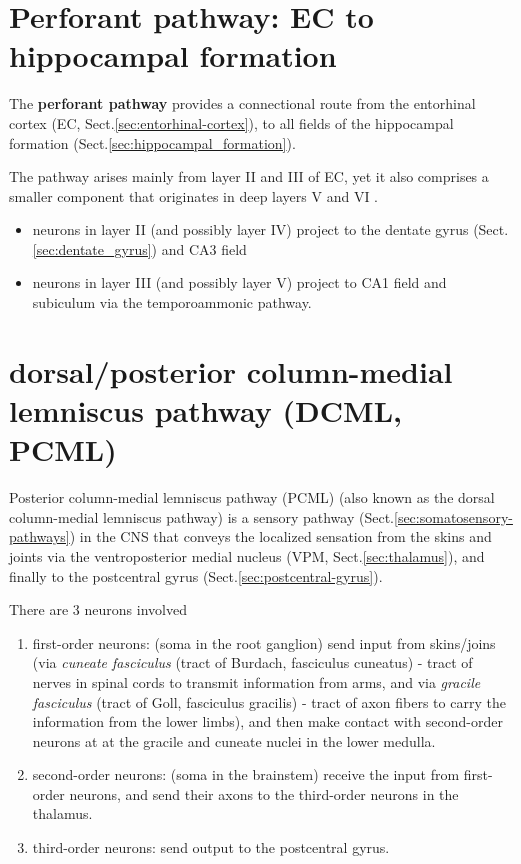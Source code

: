 \section{Perforant pathway: EC to hippocampal formation}
\label{sec:perforant-pathway}

The {\bf perforant pathway} provides a connectional route from the entorhinal
cortex (EC, Sect.\ref{sec:entorhinal-cortex}), to all fields of the 
hippocampal formation (Sect.\ref{sec:hippocampal_formation}).

The pathway arises mainly from layer II and III of EC, yet it also
comprises a smaller component that originates in deep layers V and VI
\citep{witter2007}.

\begin{itemize}
  \item neurons in layer II (and possibly layer IV) project to the dentate gyrus
  (Sect.\ref{sec:dentate_gyrus}) and CA3 field
  
  \item neurons in layer III (and possibly layer V) project to CA1 field and
  subiculum via the temporoammonic pathway.
\end{itemize}


\section{dorsal/posterior column-medial lemniscus pathway (DCML, PCML)}
\label{sec:PCML}
\label{sec:DCML}

Posterior column-medial lemniscus pathway (PCML) (also known as the dorsal
column-medial lemniscus pathway) is a sensory pathway
(Sect.\ref{sec:somatosensory-pathways}) in the CNS that conveys the localized
sensation from the skins and joints via the ventroposterior medial nucleus
(VPM, Sect.\ref{sec:thalamus}), and finally to the postcentral gyrus
(Sect.\ref{sec:postcentral-gyrus}).

There are 3 neurons involved
\begin{enumerate}
  \item first-order neurons: (soma in the root ganglion) send input from
  skins/joins (via {\it cuneate fasciculus} (tract of Burdach, fasciculus cuneatus) - tract of
  nerves in spinal cords to transmit information from arms, and via
  {\it gracile fasciculus} (tract of Goll, fasciculus gracilis) - tract of
  axon fibers to carry the information from the lower limbs), 
  and then make
  contact with second-order neurons at at the gracile and cuneate nuclei in the lower medulla.
    
  \item second-order neurons: (soma in the brainstem) receive the input from
  first-order neurons, and send their axons to the third-order neurons in the thalamus.
  
  \item third-order neurons: send output to the postcentral gyrus.
\end{enumerate}

